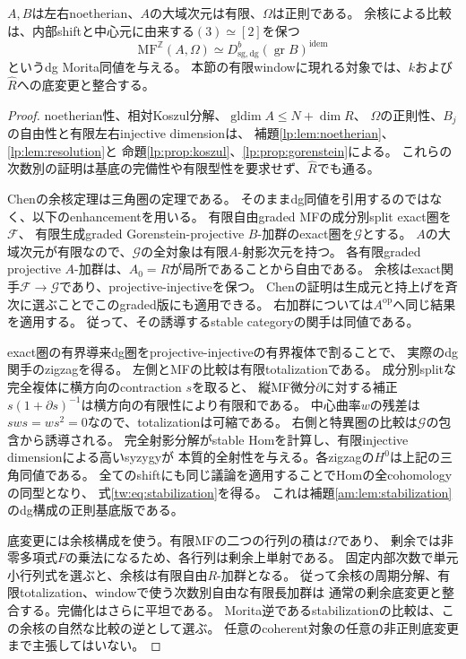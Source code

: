 \begin{lemma}\label{tw:lem:stabilization}
$A,B$は左右noetherian、$A$の大域次元は有限、$\Omega$は正則である。
余核による比較は、内部shiftと中心元に由来する$(3)\simeq[2]$を保つ
\begin{equation}\label{tw:eq:stabilization}
 \mathrm{MF}^{\mathbb Z}(A,\Omega)
 \simeq D^b_{\mathrm{sg,dg}}(\operatorname{gr}B)^{\mathrm{idem}}
\end{equation}
というdg Morita同値を与える。
本節の有限windowに現れる対象では、$k$および$\widehat R$への底変更と整合する。
\end{lemma}
\begin{proof}
noetherian性、相対Koszul分解、$\operatorname{gldim}A\le N+\dim R$、
$\Omega$の正則性、$B_j$の自由性と有限左右injective dimensionは、
補題\ref{lp:lem:noetherian}、\ref{lp:lem:resolution}と
命題\ref{lp:prop:koszul}、\ref{lp:prop:gorenstein}による。
これらの次数別の証明は基底の完備性や有限型性を要求せず、$\widehat R$でも通る。

Chenの余核定理\cite[Theorem~7.2]{AMChen}は三角圏の定理である。
そのままdg同値を引用するのではなく、以下のenhancementを用いる。
有限自由graded MFの成分別split exact圏を$\mathcal F$、
有限生成graded Gorenstein-projective $B$-加群のexact圏を$\mathcal G$とする。
$A$の大域次元が有限なので、$\mathcal G$の全対象は有限$A$-射影次元を持つ。
各有限graded projective $A$-加群は、$A_0=R$が局所であることから自由である。
余核はexact関手$\mathcal F\to\mathcal G$であり、projective-injectiveを保つ。
Chenの証明は生成元と持上げを斉次に選ぶことでこのgraded版にも適用できる。
右加群については$A^{\mathrm{op}}$へ同じ結果を適用する。
従って、その誘導するstable categoryの関手は同値である。

exact圏の有界導来dg圏をprojective-injectiveの有界複体で割ることで、
実際のdg関手のzigzagを得る。
左側とMFの比較は有限totalizationである。
成分別splitな完全複体に横方向のcontraction $s$を取ると、
縦MF微分$\partial$に対する補正$s(1+\partial s)^{-1}$は横方向の有限性により有限和である。
中心曲率$w$の残差は$sws=ws^2=0$なので、totalizationは可縮である。
右側と特異圏の比較は$\mathcal G$の包含から誘導される。
完全射影分解がstable Homを計算し、有限injective dimensionによる高いsyzygyが
本質的全射性を与える。各zigzagの$H^0$は上記の三角同値である。
全てのshiftにも同じ議論を適用することでHomの全cohomologyの同型となり、
式\eqref{tw:eq:stabilization}を得る。
これは補題\ref{am:lem:stabilization}のdg構成の正則基底版である。

底変更には余核構成を使う。有限MFの二つの行列の積は$\Omega$であり、
剰余では非零多項式$F$の乗法になるため、各行列は剰余上単射である。
固定内部次数で単元小行列式を選ぶと、余核は有限自由$R$-加群となる。
従って余核の周期分解、有限totalization、windowで使う次数別自由な有限長加群は
通常の剰余底変更と整合する。完備化はさらに平坦である。
Morita逆であるstabilizationの比較は、この余核の自然な比較の逆として選ぶ。
任意のcoherent対象の任意の非正則底変更まで主張してはいない。
\end{proof}

